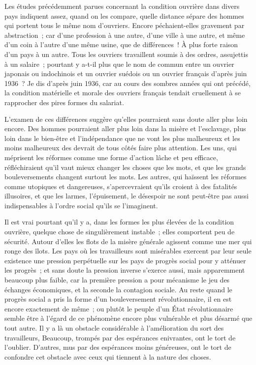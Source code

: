 \documentclass[french,twoside]{book} %
\begin{document}
\noindent \par
Les études précédemment parues concernant la condition ouvrière dans divers pays indiquent assez, quand on les compare, quelle distance sépare des hommes qui portent tous le même nom d'ouvriers. Encore péchaient-elles gravement par abstraction ; car d'une profession à une autre, d'une ville à une autre, et même d'un coin à l'autre d'une même usine, que de différences ! À plus forte raison d'un pays à un autre. Tous les ouvriers travaillent soumis à des ordres, assujettis à un salaire ; pourtant y a-t-il plus que le nom de commun entre un ouvrier japonais ou indochinois et un ouvrier suédois ou un ouvrier français d'après juin 1936 ? Je dis d'après juin 1936, car au cours des sombres années qui ont précédé, la condition matérielle et morale des ouvriers français tendait cruellement à se rapprocher des pires formes du salariat.\par
L'examen de ces différences suggère qu'elles pourraient sans doute aller plus loin encore. Des hommes pourraient aller plus loin dans la misère et l'esclavage, plus loin dans le bien-être et l'indépendance que ne vont les plus malheureux et les moins malheureux des devrait de tous côtés faire plus attention. Les uns, qui méprisent les réformes comme une forme d'action lâche et peu efficace, réfléchiraient qu'il vaut mieux changer les choses que les mots, et que les grands bouleversements changent surtout les mots. Les autres, qui haïssent les réformes comme utopiques et dangereuses, s'apercevraient qu'ils croient à des fatalités illusoires, et que les larmes, l'épuisement, le désespoir ne sont peut-être pas aussi indispensables à l'ordre social qu'ils se l'imaginent.\par
Il est vrai pourtant qu'il y a, dans les formes les plus élevées de la condition ouvrière, quelque chose de singulièrement instable ; elles comportent peu de sécurité. Autour d'elles les flots de la misère générale agissent comme une mer qui ronge des îlots. Les pays où les travailleurs sont misérables exercent par leur seule existence une pression perpétuelle sur les pays de progrès social pour y atténuer les progrès ; et sans doute la pression inverse s'exerce aussi, mais apparemment beaucoup plus faible, car la première pression a pour mécanisme le jeu des échanges économiques, et la seconde la contagion sociale. Au reste quand le progrès social a pris la forme d'un bouleversement révolutionnaire, il en est encore exactement de même ; ou plutôt le peuple d'un État révolutionnaire semble être à l'égard de ce phénomène encore plus vulnérable et plus désarmé que tout autre. Il y a là un obstacle considérable à l'amélioration du sort des travailleurs, Beaucoup, trompés par des espérances enivrantes, ont le tort de l'oublier. D'autres, mus par des espérances moins généreuses, ont le tort de confondre cet obstacle avec ceux qui tiennent à la nature des choses.\par
\end{document}
